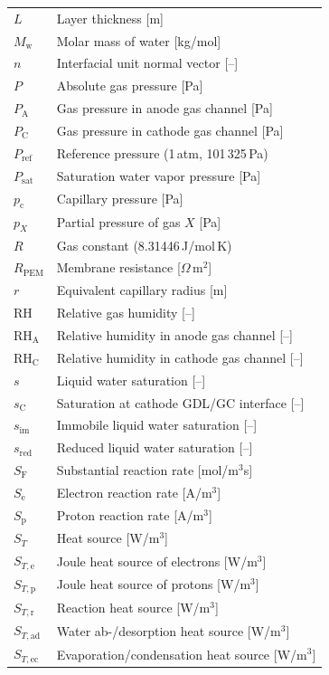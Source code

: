 \documentclass[fontsize=9pt,DIV=calc,a4paper,twocolumn]{scrartcl}
\begin{document}
\begin{xtabular}{@{}ll@{}}
$L$ & Layer thickness [m]\\
$M_\mathrm{w}$ & Molar mass of water [kg/mol]\\
$n$ & Interfacial unit normal vector [--]\\
$P$ & Absolute gas pressure [Pa]\\
$P_\mathrm{A}$ & Gas pressure in anode gas channel [Pa]\\
$P_\mathrm{C}$ & Gas pressure in cathode gas channel [Pa]\\
$P_\mathrm{ref}$ & Reference pressure (1\,atm, 101\,325\,Pa)\\
$P_\mathrm{sat}$ & Saturation water vapor pressure [Pa]\\
$p_\mathrm{c}$ & Capillary pressure [Pa]\\
$p_X$ & Partial pressure of gas $X$ [Pa]\\
$R$ & Gas constant (8.31446\,J/mol\,K)\\
$R_\mathrm{PEM}$ & Membrane resistance [$\Omega$\,m$^2$]\\
$r$ & Equivalent capillary radius [m]\\
$\mathrm{RH}$ & Relative gas humidity [--]\\
$\mathrm{RH}_\mathrm{A}$ & Relative humidity in anode gas channel [--]\\
$\mathrm{RH}_\mathrm{C}$ & Relative humidity in cathode gas channel [--]\\
$s$ & Liquid water saturation [--]\\
$s_\mathrm{C}$ & Saturation at cathode GDL/GC interface [--]\\
$s_\mathrm{im}$ & Immobile liquid water saturation [--]\\
$s_\mathrm{red}$ & Reduced liquid water saturation [--]\\
$S_\mathrm{F}$ & Substantial reaction rate [mol/m$^3$s]\\
$S_\mathrm{e}$ & Electron reaction rate [A/m$^3$]\\
$S_\mathrm{p}$ & Proton reaction rate [A/m$^3$]\\
$S_T$ & Heat source [W/m$^3$]\\
$S_{T,\mathrm{e}}$ & Joule heat source of electrons [W/m$^3$]\\
$S_{T,\mathrm{p}}$ & Joule heat source of protons [W/m$^3$]\\
$S_{T,\mathrm{r}}$ & Reaction heat source [W/m$^3$]\\
$S_{T,\mathrm{ad}}$ & Water ab-/desorption heat source [W/m$^3$]\\
$S_{T,\mathrm{ec}}$ & Evaporation/condensation heat source [W/m$^3$]\\

\end{xtabular}
\end{document}
